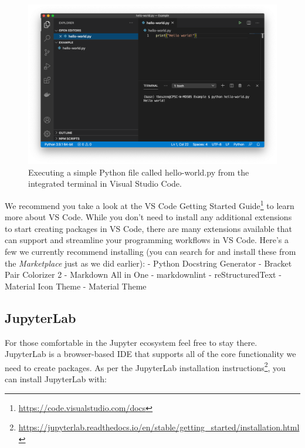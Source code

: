 \documentclass[
]{krantz}
\renewcommand{\href}[2]{#2\footnote{\url{#1}}}
\begin{document}
\begin{figure}

{\centering \includegraphics[width=1\linewidth]{../images/vscode-2} 

}

\caption{Executing a simple Python file called hello-world.py from the integrated terminal in Visual Studio Code.}\label{fig:02-vscode-2}
\end{figure}

We recommend you take a look at the VS Code \href{https://code.visualstudio.com/docs}{Getting Started Guide} to learn more about VS Code. While you don't need to install any additional extensions to start creating packages in VS Code, there are many extensions available that can support and streamline your programming workflows in VS Code. Here's a few we currently recommend installing (you can search for and install these from the \emph{Marketplace} just as we did earlier):
- Python Docstring Generator
- Bracket Pair Colorizer 2
- Markdown All in One
- markdownlint
- reStructuredText
- Material Icon Theme
- Material Theme

\hypertarget{jupyterlab}{%
\subsection{JupyterLab}\label{jupyterlab}}

For those comfortable in the Jupyter ecosystem feel free to stay there. JupyterLab is a browser-based IDE that supports all of the core functionality we need to create packages. As per the \href{https://jupyterlab.readthedocs.io/en/stable/getting_started/installation.html}{JupyterLab installation instructions}, you can install JupyterLab with:
\end{document}
